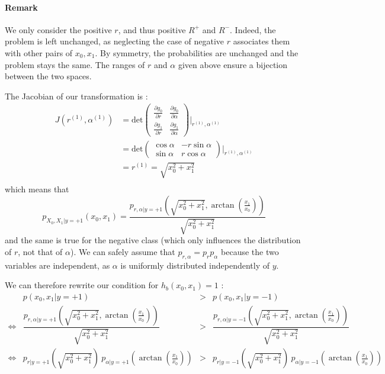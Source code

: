 \paragraph{Remark} We only consider the positive $r$, and thus positive $R^+$ and $R^-$. Indeed, the problem is left unchanged, as neglecting the case of negative $r$ associates them with other pairs of $x_0, x_1$. By symmetry, the probabilities are unchanged and the problem stays the same. The ranges of $r$ and $\alpha$ given above ensure a bijection between the two spaces.\par
The Jacobian of our transformation is : 
\begin{align*}
    J(r^{(1)}, \alpha^{(1)}) &= \text{det}\begin{pmatrix}
        \frac{\partial g_0}{\partial r} & \frac{\partial g_0}{\partial \alpha}\\
        \frac{\partial g_1}{\partial r} & \frac{\partial g_1}{\partial \alpha}
    \end{pmatrix} \bigg\rvert_{r^{(1)}, \alpha^{(1)}}\\
    &= \text{det}\begin{pmatrix}
        \cos{\alpha} & -r\sin{\alpha}\\
        \sin{\alpha} & r\cos{\alpha}
    \end{pmatrix}\bigg\rvert_{r^{(1)}, \alpha^{(1)}}\\
    &= r^{(1)} = \sqrt{x_0^2 + x_1^2}\\
\end{align*}
which means that 
$$
p_{X_0, X_1 | y = +1}(x_0, x_1) = \dfrac{p_{r, \alpha | y = +1}(\sqrt{x_0^2 + x_1^2}, \arctan(\frac{x_1}{x_0}))}{\sqrt{x_0^2 + x_1^2}}
$$
and the same is true for the negative class (which only influences the distribution of $r$, not that of $\alpha$). We can safely assume that $p_{r, \alpha} = p_r p_\alpha$ because the two variables are independent, as $\alpha$ is uniformly distributed independently of $y$.\par
We can therefore rewrite our condition for $h_b(x_0, x_1) = 1$ :
$$
\begin{array}{cccc}
    & p(x_0, x_1 | y=+1) & > &  p(x_0, x_1 | y=-1) \\
    \iff & \dfrac{p_{r, \alpha | y = +1}(\sqrt{x_0^2 + x_1^2}, \arctan(\frac{x_1}{x_0}))}{\sqrt{x_0^2 + x_1^2}} & > & \dfrac{p_{r, \alpha | y = -1}(\sqrt{x_0^2 + x_1^2}, \arctan(\frac{x_1}{x_0}))}{\sqrt{x_0^2 + x_1^2}}\\
   \iff & p_{r| y = +1}(\sqrt{x_0^2 + x_1^2})\ p_{\alpha | y = +1}(\arctan(\frac{x_1}{x_0})) & > & p_{r| y = -1}(\sqrt{x_0^2 + x_1^2})\ p_{\alpha | y = -1}(\arctan(\frac{x_1}{x_0}))
\end{array}
$$
